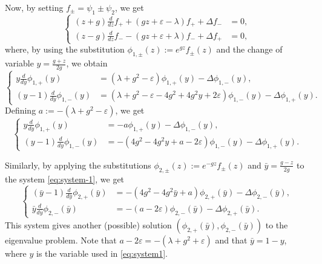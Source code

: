 \documentclass[11pt]{article}
\numberwithin{equation}{section}
\newcommand{\e}{\varepsilon}
\theoremstyle{plain}
\theoremstyle{definition}
\theoremstyle{remark}
\begin{document}
Now, by setting \(f_\pm = \psi_1 \pm \psi_2 \), we get
\begin{equation}  \label{eq:system-1}
  \left\{
  \begin{aligned}
  (z + g) \frac{d}{d z} f_+ + (g z + \e - \lambda) f_+ + \Delta f_- &= 0, \\
  (z - g) \frac{d}{d z} f_- - (g z + \e + \lambda) f_- + \Delta f_+ &= 0,
  \end{aligned}
  \right.
\end{equation}
where, by using the substitution \( \phi_{1,\pm}(z) := e^{g z} f_\pm (z) \)
and the change of variable \( y = \frac{g+z}{2 g}\), we obtain
\begin{equation} \label{eq:system0}
  \left\{
  \begin{aligned}
  y \frac{d}{d y} \phi_{1,+}(y) &= ( \lambda + g^2  - \e ) \phi_{1,+}(y) - \Delta \phi_{1,-}(y), \\
  (y-1) \frac{d}{d y} \phi_{1,-}(y) &= ( \lambda + g^2 - \e  -4 g^2 + 4 g^2 y + 2\e) \phi_{1,-}(y) - \Delta \phi_{1,+}(y).
  \end{aligned} \right.
\end{equation}
Defining \( a := -(\lambda + g^2 - \e) \), we get
\begin{equation} \label{eq:system1}
  \left\{
  \begin{aligned}
   y \frac{d}{d y} \phi_{1,+}(y) &= - a \phi_{1,+}(y) - \Delta \phi_{1,-}(y),  \\
   (y-1) \frac{d}{d y} \phi_{1,-}(y) &= -( 4 g^2 - 4 g^2 y  + a - 2\e) \phi_{1,-} (y) - \Delta \phi_{1,+} (y).
  \end{aligned} \right.
\end{equation}

Similarly, by applying the substitutions \( \phi_{2,\pm}(z) := e^{-g z} f_\pm (z) \) and \(\bar{y} = \frac{g-z}{2g}\) to the system
\eqref{eq:system-1}, we get
\begin{equation} \label{eq:system2p}
  \left\{
  \begin{aligned}
    (\bar{y}-1) \frac{d}{d \bar{y}} \phi_{2,+}(\bar{y}) &= -(4g^2 - 4 g^2 \bar{y} + a)\phi_{2,+}(\bar{y}) - \Delta \phi_{2,-}(\bar{y}),  \\
    \bar{y} \frac{d}{d \bar{y}} \phi_{2,-}(\bar{y}) &= -( a  -  2\e) \phi_{2,-} (\bar{y}) - \Delta \phi_{2,+} (\bar{y}).
  \end{aligned} \right.
\end{equation}
This system gives another (possible) solution \((\phi_{2,+}(\bar{y}),\phi_{2,-}(\bar{y}))\) to the eigenvalue problem.
Note that $a  -  2\e= -(\lambda+g^2+\e)$ and that \(\bar{y} = 1-y\), where \(y\) is the variable used in \eqref{eq:system1}.
\end{document}
